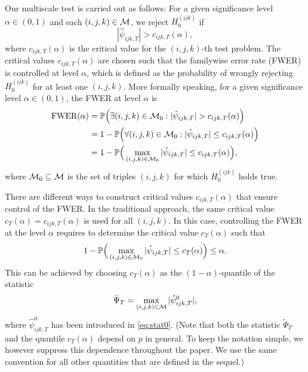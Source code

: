 \documentclass[a4paper,12pt]{article}
\numberwithin{equation}{section}
\begin{document}
Our multiscale test is carried out as follows: For a given significance level $\alpha \in (0,1)$ and each $(i,j,k) \in \mathcal{M}$, we reject $H_0^{(ijk)}$ if 
\[ |\hat{\psi}_{ijk,T}| > c_{ijk,T}(\alpha), \]
where $c_{ijk,T}(\alpha)$ is the critical value for the $(i,j,k)$-th test problem. The critical values $c_{ijk,T}(\alpha)$ are chosen such that the familywise error rate (FWER) is controlled at level $\alpha$, which is defined as the probability of wrongly rejecting $H_0^{(ijk)}$ for at least one $(i,j,k)$. More formally speaking, for a given significance level $\alpha \in (0,1)$, the FWER at level $\alpha$ is 
\begin{align*}
\text{FWER}(\alpha) 
 & = \mathbb{P} \Big( \exists (i,j,k) \in \mathcal{M}_0: |\hat{\psi}_{ijk,T}| > c_{ijk,T}(\alpha) \Big) \\
 & =  1 - \mathbb{P} \Big( \forall (i,j,k) \in \mathcal{M}_0: |\hat{\psi}_{ijk,T}| \le c_{ijk,T}(\alpha) \Big) \\
 & = 1 - \mathbb{P}\Big( \max_{(i,j,k) \in \mathcal{M}_0} |\hat{\psi}_{ijk,T}| \le c_{ijk,T}(\alpha) \Big), 
\end{align*}
where $\mathcal{M}_0 \subseteq \mathcal{M}$ is the set of triples $(i,j,k)$ for which $H_0^{(ijk)}$ holds true.  


There are different ways to construct critical values $c_{ijk,T}(\alpha)$ that ensure control of the FWER. In the traditional approach, the same critical value $c_T(\alpha) = c_{ijk,T}(\alpha)$ is used for all $(i,j,k)$. In this case, controlling the FWER at the level $\alpha$ requires to determine the critical value $c_T(\alpha)$ such that
\begin{equation}\label{eq:FWER-tilde}
1 - \mathbb{P}\Big( \max_{(i,j,k) \in \mathcal{M}_0} |\hat{\psi}_{ijk,T}| \le c_T(\alpha) \Big) \le \alpha. 
\end{equation}
This can be achieved by choosing $c_T(\alpha)$ as the $(1-\alpha)$-quantile of the statistic 
\[ \tilde{\Psi}_T = \max_{(i,j,k) \in \mathcal{M}} |\hat{\psi}_{ijk,T}^0|, \]
where $\hat{\psi}_{ijk,T}^0$ has been introduced in \eqref{eq:stat0}. (Note that both the statistic $\tilde{\Psi}_T$ and the quantile $c_T(\alpha)$ depend on $p$ in general. To keep the notation simple, we however suppress this dependence throughout the paper. We use the same convention for all other quantities that are defined in the sequel.) 
\end{document}
